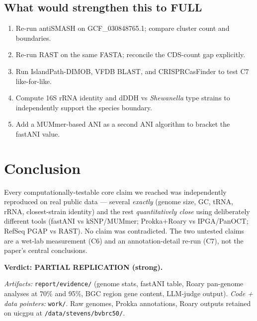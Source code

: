 \documentclass[11pt]{article}
\begin{document}
\subsection*{What would strengthen this to FULL}
\begin{enumerate}[leftmargin=*]
  \item Re-run antiSMASH on GCF\_030848765.1; compare cluster count and boundaries.
  \item Re-run RAST on the same FASTA; reconcile the CDS-count gap explicitly.
  \item Run IslandPath-DIMOB, VFDB BLAST, and CRISPRCasFinder to test C7 like-for-like.
  \item Compute 16S rRNA identity and dDDH vs \emph{Shewanella} type strains to independently support the species boundary.
  \item Add a MUMmer-based ANI as a second ANI algorithm to bracket the fastANI value.
\end{enumerate}

\section{Conclusion}
Every computationally-testable core claim we reached was independently reproduced on real public data --- several \emph{exactly} (genome size, GC, tRNA, rRNA, closest-strain identity) and the rest \emph{quantitatively close} using deliberately different tools (fastANI vs kSNP/MUMmer; Prokka+Roary vs IPGA/PanOCT; RefSeq PGAP vs RAST). No claim was contradicted. The two untested claims are a wet-lab measurement (C6) and an annotation-detail re-run (C7), not the paper's central conclusions.

\vspace{0.5em}
\noindent\textbf{Verdict: PARTIAL REPLICATION (strong).}

\vspace{1em}
\noindent\emph{Artifacts:} \texttt{report/evidence/} (genome stats, fastANI table, Roary pan-genome analyses at 70\% and 95\%, BGC region gene content, LLM-judge output). \emph{Code + data pointers:} \texttt{work/}. Raw genomes, Prokka annotations, Roary outputs retained on uicgpu at \texttt{/data/stevens/bvbrc50/}.
\end{document}
